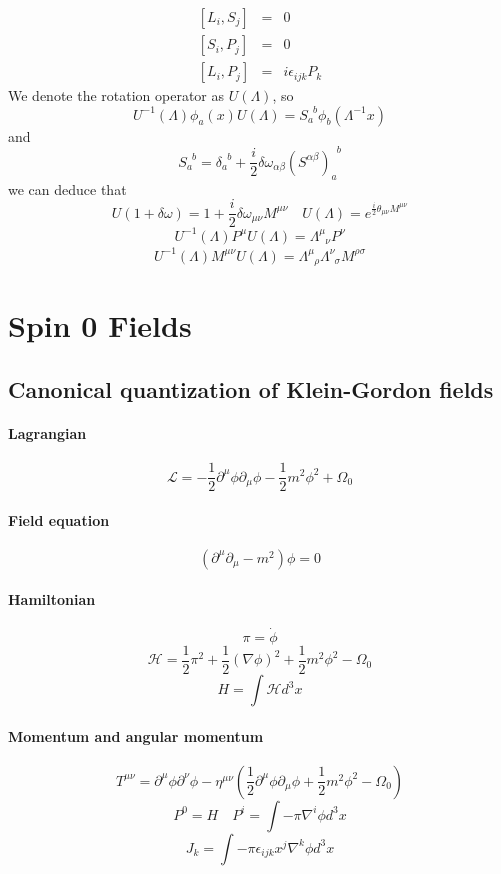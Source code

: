 \documentclass{article}
\begin{document}
\begin{eqnarray}
\left[L_i,S_j\right] &=& 0 \nonumber \\
\left[S_i,P_j\right] &=& 0 \nonumber \\
\left[L_i,P_j\right] &=& i\epsilon_{ijk}P_k \nonumber
\end{eqnarray}
We denote the rotation operator as $U(\Lambda)$, so
\[U^{-1}(\Lambda) \phi_a(x) U(\Lambda) = S_{a}^{\phantom{a}b}\phi_b(\Lambda^{-1}x)\]
and 
\[S_{a}^{\phantom{a}b} = \delta_{a}^{\phantom{a}b}+\frac{i}{2} \delta \omega_{\alpha \beta} (S^{\alpha \beta})_{a}^{\phantom{a}b} \]
we can deduce that
\[U(1+\delta \omega) = 1 + \frac{i}{2} \delta \omega_{\mu \nu} M^{\mu \nu} \quad U(\Lambda) = e^{\frac{i}{2} \theta_{\mu \nu} M^{\mu \nu}}\]
\[U^{-1}(\Lambda) P^{\mu} U(\Lambda) = \Lambda^{\mu}_{\phantom{\mu}\nu} P^{\nu}\]
\[U^{-1}(\Lambda) M^{\mu \nu} U(\Lambda) = \Lambda^{\mu}_{\phantom{\mu}\rho} \Lambda^{\nu}_{\phantom{\nu}\sigma}M^{\rho \sigma}\]

\section{Spin 0 Fields}
\subsection{Canonical quantization of Klein-Gordon fields}
\paragraph{Lagrangian}
\[\mathcal{L} = -\frac{1}{2} \partial^{\mu} \phi \partial_{\mu} \phi -\frac{1}{2}m^2 \phi^2 + \Omega_0\]
\paragraph{Field equation}
\[(\partial^{\mu} \partial_{\mu} - m^2) \phi = 0\]
\paragraph{Hamiltonian}
\[\pi = \dot{\phi}\]
\[\mathcal{H} = \frac{1}{2} \pi^2 + \frac{1}{2} (\nabla \phi)^2 + \frac{1}{2} m^2 \phi^2-\Omega_0\]
\[H = \int \mathcal{H} d^3 x\]
\paragraph{Momentum and angular momentum}
\[T^{\mu \nu} = \partial^{\mu} \phi \partial^{\nu} \phi - \eta^{\mu \nu}(\frac{1}{2}\partial^{\mu}\phi \partial_{\mu} \phi + \frac{1}{2}m^2 \phi^2 -\Omega_0)\]
\[P^0 = H \quad P^i = \int -\pi \nabla^i \phi d^3 x\]
\[J_k = \int - \pi \epsilon_{ijk} x^{j} \nabla^{k} \phi d^3 x\]
\end{document}
